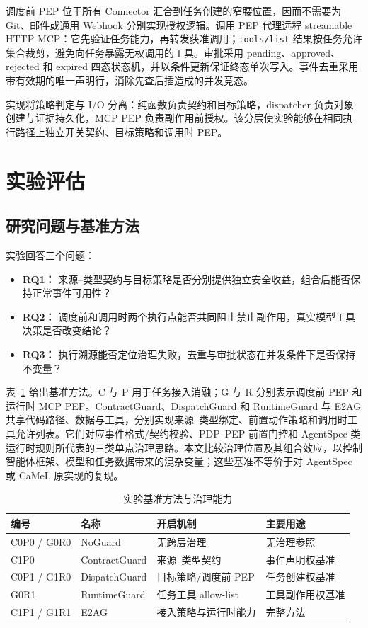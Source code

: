 调度前 PEP 位于所有 Connector 汇合到任务创建的窄腰位置，因而不需要为 Git、邮件或通用 Webhook 分别实现授权逻辑。调用 PEP 代理远程 streamable HTTP MCP：它先验证任务能力，再转发获准调用；\texttt{tools/list} 结果按任务允许集合裁剪，避免向任务暴露无权调用的工具。审批采用 pending、approved、rejected 和 expired 四态状态机，并以条件更新保证终态单次写入。事件去重采用带有效期的唯一声明行，消除先查后插造成的并发竞态。

实现将策略判定与 I/O 分离：纯函数负责契约和目标策略，dispatcher 负责对象创建与证据持久化，MCP PEP 负责副作用前授权。该分层使实验能够在相同执行路径上独立开关契约、目标策略和调用时 PEP。

\section{实验评估}\label{sec:evaluation-v1}

\subsection{研究问题与基准方法}

实验回答三个问题：
\begin{itemize}
\item \textbf{RQ1：} 来源--类型契约与目标策略是否分别提供独立安全收益，组合后能否保持正常事件可用性？
\item \textbf{RQ2：} 调度前和调用时两个执行点能否共同阻止禁止副作用，真实模型工具决策是否改变结论？
\item \textbf{RQ3：} 执行溯源能否定位治理失败，去重与审批状态在并发条件下是否保持不变量？
\end{itemize}

表~\ref{tab:baselines-v1} 给出基准方法。C 与 P 用于任务接入消融；G 与 R 分别表示调度前 PEP 和运行时 MCP PEP。ContractGuard、DispatchGuard 和 RuntimeGuard 与 E2AG 共享代码路径、数据与工具，分别实现来源--类型绑定、前置动作策略和调用时工具允许列表。它们对应事件格式/契约校验、PDP--PEP 前置门控和 AgentSpec 类运行时规则所代表的三类单点治理思路。本文比较治理位置及其组合效应，以控制智能体框架、模型和任务数据带来的混杂变量；这些基准不等价于对 AgentSpec 或 CaMeL 原实现的复现。

\begin{table}[htbp]
\centering
\caption{实验基准方法与治理能力}
\label{tab:baselines-v1}
\small
\begin{tabular}{llll}
\toprule
编号 & 名称 & 开启机制 & 主要用途 \\
\midrule
C0P0 / G0R0 & NoGuard & 无跨层治理 & 无治理参照 \\
C1P0 & ContractGuard & 来源--类型契约 & 事件声明权基准 \\
C0P1 / G1R0 & DispatchGuard & 目标策略/调度前 PEP & 任务创建权基准 \\
G0R1 & RuntimeGuard & 任务工具 allow-list & 工具副作用权基准 \\
C1P1 / G1R1 & E2AG & 接入策略与运行时能力 & 完整方法 \\
\bottomrule
\end{tabular}
\end{table}

